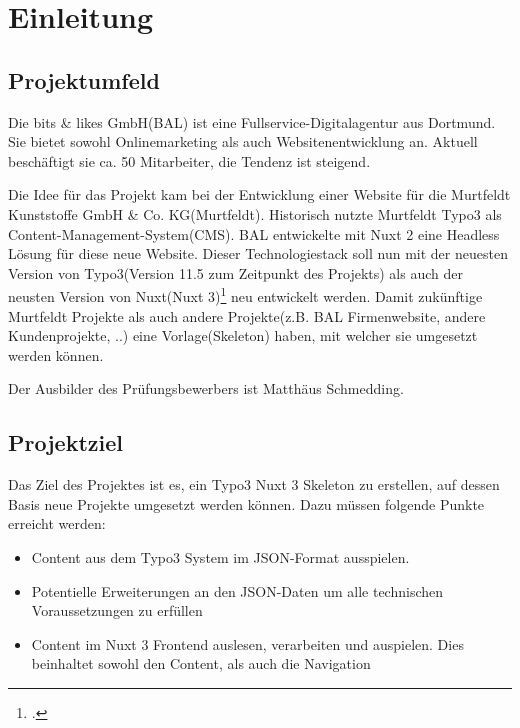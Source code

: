 \section{Einleitung}
\label{sec:Einleitung}


\subsection{Projektumfeld} 
\label{sec:Projektumfeld}
Die bits \& likes GmbH(\acs{BAL}) ist eine Fullservice-Digitalagentur aus Dortmund. Sie bietet sowohl Onlinemarketing als auch Websitenentwicklung an. Aktuell beschäftigt sie ca. 50 Mitarbeiter, die Tendenz ist steigend.

Die Idee für das Projekt kam bei der Entwicklung einer Website für die Murtfeldt Kunststoffe GmbH \& Co. KG(Murtfeldt). Historisch nutzte Murtfeldt Typo3 als Content-Management-System(\acs{CMS}). \acs{BAL} entwickelte mit Nuxt 2 eine Headless Lösung für diese neue Website. Dieser Technologiestack soll nun mit der neuesten Version von Typo3(Version 11.5 zum Zeitpunkt des Projekts) als auch der neusten Version von Nuxt(Nuxt 3)\footnote{\Vgl \citet{Nuxt3}.} neu entwickelt werden. Damit zukünftige Murtfeldt Projekte als auch andere Projekte(z.B. \acs{BAL} Firmenwebsite, andere Kundenprojekte, ..) eine Vorlage(Skeleton) haben, mit welcher sie umgesetzt werden können.

Der Ausbilder des Prüfungsbewerbers ist Matthäus Schmedding.


\subsection{Projektziel} 
\label{sec:Projektziel}
Das Ziel des Projektes ist es, ein Typo3 Nuxt 3 Skeleton zu erstellen, auf dessen Basis neue Projekte umgesetzt werden können. Dazu müssen folgende Punkte erreicht werden:
\begin{itemize}
	\item Content aus dem Typo3 System im JSON-Format ausspielen.
	\item Potentielle Erweiterungen an den JSON-Daten um alle technischen Voraussetzungen zu erfüllen
	\item Content im Nuxt 3 Frontend auslesen, verarbeiten und auspielen. Dies beinhaltet sowohl den Content, als auch die Navigation
\end{itemize}

